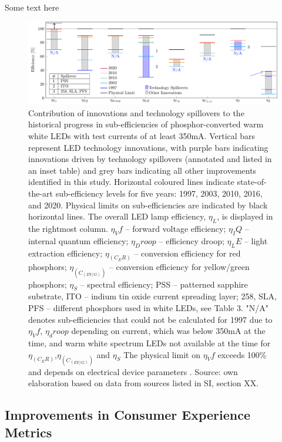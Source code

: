 \documentclass[twoside,twocolumn,9pt]{article}
\begin{document}
Some text here

\begin{figure}[h!]
 \centering
 \includegraphics[width=\textwidth]{2_SSL_EES/article/figures/breakthroughs_efficiency.pdf}
 \caption{Contribution of innovations and technology spillovers to the historical progress in sub-efficiencies of phosphor-converted warm white LEDs with test currents of at least 350mA. Vertical bars represent LED technology innovations, with purple bars indicating innovations driven by technology spillovers (annotated and listed in an inset table) and grey bars indicating all other improvements identified in this study. Horizontal coloured lines indicate state-of-the-art sub-efficiency levels for five years: 1997, 2003, 2010, 2016, and 2020. Physical limits on sub-efficiencies are indicated by black horizontal lines. The overall LED lamp efficiency, $\eta_L$, is displayed in the rightmost column. $\eta_Vf$ – forward voltage efficiency; $\eta_IQ$ – internal quantum efficiency; $\eta_Droop$ – efficiency droop; $\eta_LE$ – light extraction efficiency; $\eta_(C_ER)$ – conversion efficiency for red phosphors; $\eta_(C_(EY/G))$ – conversion efficiency for yellow/green phosphors; $\eta_S$ – spectral efficiency; PSS – patterned sapphire substrate, ITO – indium tin oxide current spreading layer; 258, SLA, PFS – different phosphors used in white LEDs, see Table 3. "N/A" denotes sub-efficiencies that could not be calculated for 1997 due to $\eta_Vf$, $\eta_droop$ depending on current, which was below 350mA at the time, and warm white spectrum LEDs not available at the time for $\eta_(C_ER)$,$\eta_(C_(EY/G))$  and $\eta_S$ The physical limit on $\eta_Vf$ exceeds 100\% and depends on electrical device parameters \cite{david2016electrical}. Source: own elaboration based on data from sources listed in SI, section XX.}
 \label{fgr:breakthroughs_efficiency}
\end{figure}

\subsection{Improvements in Consumer Experience Metrics}
\end{document}
